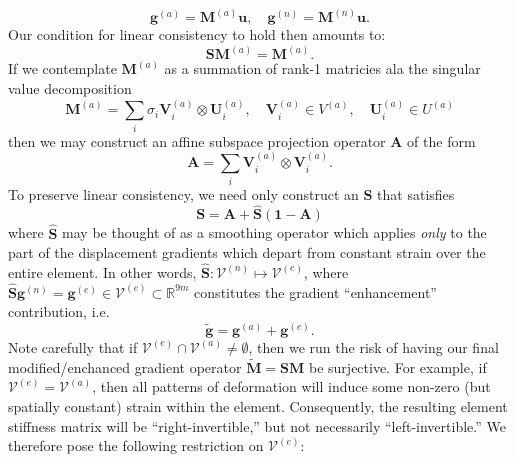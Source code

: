 \documentclass[12pt]{article}
\begin{document}
\begin{itemize}
        \begin{equation}
                \mathbf{g}^{(a)} = \mathbf{M}^{(a)} \mathbf{u}, \quad \mathbf{g}^{(n)} = \mathbf{M}^{(n)} \mathbf{u}.
        \end{equation}
        Our condition for linear consistency to hold then amounts to:
        \begin{equation}
                \mathbf{S} \mathbf{M}^{(a)} = \mathbf{M}^{(a)}.
        \end{equation}
        If we contemplate $\mathbf{M}^{(a)}$ as a summation of rank-1 matricies ala the singular value decomposition
        \begin{equation}
                \mathbf{M}^{(a)} = \sum_i \sigma_i \mathbf{V}^{(a)}_i \otimes \mathbf{U}^{(a)}_i, \quad \mathbf{V}^{(a)}_i \in V^{(a)}, \quad \mathbf{U}^{(a)}_i \in U^{(a)}
        \end{equation}
        then we may construct an affine subspace projection operator $\mathbf{A}$ of the form
        \begin{equation}
                \mathbf{A} = \sum_i \mathbf{V}^{(a)}_i \otimes \mathbf{V}^{(a)}_i.
	     \label{eq:Asub}
        \end{equation}
        To preserve linear consistency, we need only construct an $\mathbf{S}$ that satisfies
        \begin{equation}
                \mathbf{S} = \mathbf{A} + \hat{\mathbf{S}} (\mathbf{1} - \mathbf{A})
	     \label{eq:Ssub}
        \end{equation}
        where $\hat{\mathbf{S}}$ may be thought of as a smoothing operator which applies \textit{only} to the part of the displacement gradients which depart from constant strain over the entire element. In other words, $\hat{\mathbf{S}} \colon \mathcal{V}^{(n)} \mapsto \mathcal{V}^{(e)}$, where $\hat{\mathbf{S}} \mathbf{g}^{(n)} = \mathbf{g}^{(e)} \in \mathcal{V}^{(e)} \subset \mathbb{R}^{9m}$ constitutes the gradient ``enhancement'' contribution, i.e.
        \begin{equation}
                \tilde{\mathbf{g}} = \mathbf{g}^{(a)} + \mathbf{g}^{(e)}.
        \end{equation}
        Note carefully that if $\mathcal{V}^{(e)} \cap \mathcal{V}^{(a)} \neq \emptyset$, then we run the risk of having our final modified/enchanced gradient operator $\tilde{\mathbf{M}} = \mathbf{S} \mathbf{M}$ be surjective. For example, if $\mathcal{V}^{(e)} = \mathcal{V}^{(a)}$, then all patterns of deformation will induce some non-zero (but spatially constant) strain within the element. Consequently, the resulting element stiffness matrix will be ``right-invertible,'' but not necessarily ``left-invertible.'' We therefore pose the following restriction on $\mathcal{V}^{(e)}$:

\end{itemize}
\end{document}
